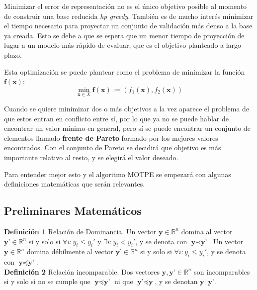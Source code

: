 Minimizar el error de representación no es el único objetivo posible al momento de construir una base reducida \textit{hp greedy}. También es de mucho interés minimizar el tiempo necesario para proyectar un conjunto de validación más denso a la base ya creada. Esto se debe a que se espera que un menor tiempo de proyección de lugar a un modelo más rápido de evaluar, que es el objetivo planteado a largo plazo.


Esta optimización se puede plantear como el problema de minimizar la función $\textbf{f}(\textbf{x})$:
\[
 \min_{\textbf{x} \in X} \textbf{f}(\textbf{x}) := (f_1(\textbf{x}), f_2(\textbf{x}))
\]

Cuando se quiere minimizar dos o más objetivos a la vez aparece el problema de que estos entran en conflicto entre sí, por lo que ya no se puede hablar de encontrar un valor mínimo en general, pero sí se puede encontrar un conjunto de elementos llamado \textbf{frente de Pareto} formado por los mejores valores encontrados. Con el conjunto de Pareto se decidirá que objetivo es más importante relativo al resto, y se elegirá el valor deseado.

Para entender mejor esto y el algoritmo MOTPE se empezará con algunas definiciones matemáticas que serán relevantes.

\subsection{Preliminares Matemáticos}

\noindent\textbf{Definición 1} Relación de Dominancia. Un vector $\textbf{y} \in \mathbb{R}^n$ domina al vector $\textbf{y'} \in \mathbb{R}^n$ si y solo si $\forall i: y_i \leq y_i'$ y $\exists i : y_i < y_i'$, y se denota con $\textbf{y} \prec \textbf{y'} $. Un vector $\textbf{y} \in \mathbb{R}^n$ domina débilmente al vector $\textbf{y'} \in \mathbb{R}^n$ si y solo si $\forall i: y_i \leq y_i'$, y se denota con $\textbf{y} \preceq \textbf{y'} $. \\


\noindent\textbf{Definición 2} Relación incomparable. Dos vectores $\textbf{y},\textbf{y'} \in \mathbb{R}^n$ son incomparables si y solo si no se cumple que $\textbf{y} \preceq \textbf{y'} $ ni que $\textbf{y'} \preceq \textbf{y} $, y se denotan $\textbf{y}||\textbf{y'}$.\\



